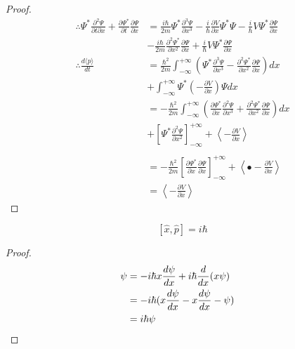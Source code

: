 \begin{proof}
\begin{align*}
\therefore \Psi^* \frac{\partial^2 \Psi}{\partial t \partial x} + \frac{\partial \Psi^*}{\partial t} \frac{\partial \Psi}{\partial x}
& = \frac{i \hbar}{2m} \Psi^* \frac{\partial^3 \Psi}{\partial x^3} - \frac{i}{\hbar} \frac{\partial V}{\partial x} \Psi^* \Psi - \frac{i}{\hbar} V \Psi^* \frac{\partial \Psi}{\partial x} \\
& - \frac{i \hbar}{2m} \frac{\partial^2 \Psi^*}{\partial x^2} \frac{\partial \Psi}{\partial x} + \frac{i}{\hbar} V \Psi^* \frac{\partial \Psi}{\partial x} \\
\therefore \frac{d \langle p \rangle}{dt}
& = \frac{\hbar^2}{2m} \int_{-\infty}^{+ \infty} \left( \Psi^* \frac{\partial^3 \Psi}{\partial x^3} - \frac{\partial^2 \Psi^*}{\partial x^2} \frac{\partial \Psi}{\partial x} \right) dx \\
& + \int_{-\infty}^{+ \infty} \Psi^* \left(- \frac{\partial V}{\partial x} \right) \Psi dx \\
& = - \frac{\hbar^2}{2m} \int_{-\infty}^{+ \infty} \left( \frac{\partial \Psi^*}{\partial x} \frac{\partial^2 \Psi}{\partial x^3} + \frac{\partial^2 \Psi^*}{\partial x^2} \frac{\partial \Psi}{\partial x} \right) dx \\
& + \left[ \Psi^* \frac{\partial^2 \Psi}{\partial x^2} \right]_{- \infty}^{+ \infty} 
+ \left \langle - \frac{\partial V}{\partial x} \right\rangle \\ \\
& = - \frac{\hbar^2}{2m} \left[ \frac{\partial \Psi^*}{\partial x} \frac{\partial \Psi}{\partial x} \right]_{-\infty}^{+\infty} + \left\langle\textbf{•} - \frac{\partial V}{\partial x} \right\rangle \\
& = \left\langle - \frac{\partial V}{\partial x} \right\rangle %
\end{align*}
\end{proof}

\begin{prop}
\[ [\hat{x}, \hat{p}] = i \hbar \]
\end{prop}

\begin{proof}
\pf
\begin{align*}
[ \hat{x}, \hat{p}] \psi & = - i \hbar x \frac{d \psi}{d x} + i \hbar \frac{d}{dx} (x \psi) \\
& = - i \hbar (x \frac{d \psi}{dx} - x \frac{d \psi}{dx} - \psi) \\
& = i \hbar \psi & \qed
\end{align*}
\end{proof}
